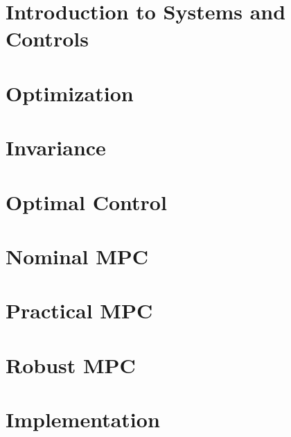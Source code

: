 \documentclass[layout=summary, columns=4,secnumdepth=2,tight]{sst-custom}
\begin{document}
\iftoggle{do-multicol}{ \begin{multicols*}{\numcolumns}}{}
		
		\iftoggle{use-small-font}{\footnotesize}{}
		\renewcommand{\contentsname}{}
		\vspace{-8mm}
		\tableofcontents
		
		\section{Introduction to Systems and Controls}
		
		
		\section{Optimization}
		
		
		\section{Invariance}
		
		\section{Optimal Control}
		
		
		\section{Nominal MPC}
		
		\section{Practical MPC}
		
		\section{Robust MPC}
		
		\section{Implementation}
		
		\iftoggle{do-multicol}{\end{multicols*}}{}
\end{document}

